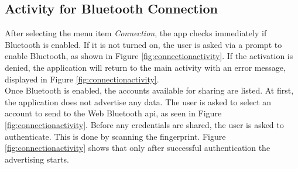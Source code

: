 
\subsection{Activity for Bluetooth Connection}
After selecting the menu item \textit{Connection}, the app checks immediately if Bluetooth is enabled. If it is not turned on, the user is asked via a prompt to enable Bluetooth, as shown in Figure \ref{fig:connectionactivity}\protect{}.
If the activation is denied, the application will return to the main activity with an error message, displayed in Figure \ref{fig:connectionactivity}\protect{}. \\
Once Bluetooth is enabled, the accounts available for sharing are listed. At first, the application does not advertise any data. The user is asked to select an account to send to the Web Bluetooth \gls{api}, as seen in Figure \ref{fig:connectionactivity}\protect{}. Before any credentials are shared, the user is asked to authenticate. This is done by scanning the fingerprint. Figure \ref{fig:connectionactivity}\protect{} shows that only after successful authentication the advertising starts.


